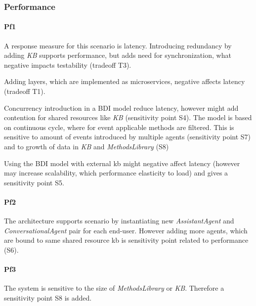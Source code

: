 \documentclass{llncs}
\begin{document}
\subsubsection{Performance}
\paragraph{Pf1} A response measure for this scenario is latency. 
Introducing redundancy by adding \emph{KB} supports performance, but adds need for synchronization, what negative impacts testability (tradeoff T3).

Adding layers, which are implemented as microservices, negative affects latency (tradeoff T1). 

Concurrency introduction in a \gls{BDI} model reduce latency, however might add contention for shared resources like \emph{KB} (sensitivity point S4). The model is based on continuous cycle, where for event applicable methods are filtered. This is sensitive to amount of events introduced by multiple agents (sensitivity point S7) and to growth of data in \emph{KB} and \emph{MethodsLibrary} (S8) 

Using the \gls{BDI} model with external \gls{kb} might negative affect latency (however may increase scalability, which performance elasticity to load) and gives a sensitivity point S5. 
\paragraph{Pf2} The architecture supports scenario by instantiating new \emph{AssistantAgent} and \emph{ConversationalAgent} pair for each end-user. However adding more agents, which are bound to same shared resource \gls{kb} is sensitivity point related to performance (S6).
\paragraph{Pf3} The system is sensitive to the size of \emph{MethodsLibrary} or \emph{KB}. Therefore a sensitivity point S8 is added.

\end{document}
